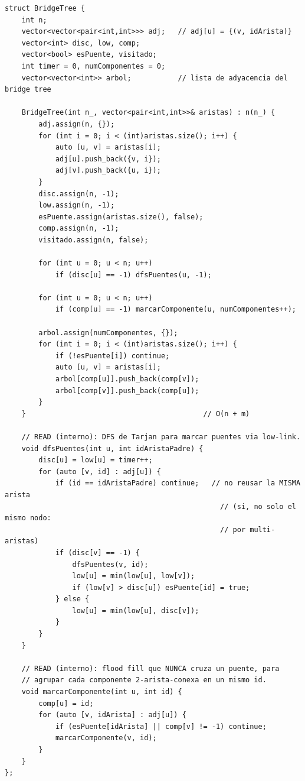\documentclass[10pt,a4paper,twocolumn]{article}
\begin{document}
\begin{lstlisting}[style=cpp]
struct BridgeTree {
    int n;
    vector<vector<pair<int,int>>> adj;   // adj[u] = {(v, idArista)}
    vector<int> disc, low, comp;
    vector<bool> esPuente, visitado;
    int timer = 0, numComponentes = 0;
    vector<vector<int>> arbol;           // lista de adyacencia del bridge tree

    BridgeTree(int n_, vector<pair<int,int>>& aristas) : n(n_) {
        adj.assign(n, {});
        for (int i = 0; i < (int)aristas.size(); i++) {
            auto [u, v] = aristas[i];
            adj[u].push_back({v, i});
            adj[v].push_back({u, i});
        }
        disc.assign(n, -1);
        low.assign(n, -1);
        esPuente.assign(aristas.size(), false);
        comp.assign(n, -1);
        visitado.assign(n, false);

        for (int u = 0; u < n; u++)
            if (disc[u] == -1) dfsPuentes(u, -1);

        for (int u = 0; u < n; u++)
            if (comp[u] == -1) marcarComponente(u, numComponentes++);

        arbol.assign(numComponentes, {});
        for (int i = 0; i < (int)aristas.size(); i++) {
            if (!esPuente[i]) continue;
            auto [u, v] = aristas[i];
            arbol[comp[u]].push_back(comp[v]);
            arbol[comp[v]].push_back(comp[u]);
        }
    }                                          // O(n + m)

    // READ (interno): DFS de Tarjan para marcar puentes via low-link.
    void dfsPuentes(int u, int idAristaPadre) {
        disc[u] = low[u] = timer++;
        for (auto [v, id] : adj[u]) {
            if (id == idAristaPadre) continue;   // no reusar la MISMA arista
                                                   // (si, no solo el mismo nodo:
                                                   // por multi-aristas)
            if (disc[v] == -1) {
                dfsPuentes(v, id);
                low[u] = min(low[u], low[v]);
                if (low[v] > disc[u]) esPuente[id] = true;
            } else {
                low[u] = min(low[u], disc[v]);
            }
        }
    }

    // READ (interno): flood fill que NUNCA cruza un puente, para
    // agrupar cada componente 2-arista-conexa en un mismo id.
    void marcarComponente(int u, int id) {
        comp[u] = id;
        for (auto [v, idArista] : adj[u]) {
            if (esPuente[idArista] || comp[v] != -1) continue;
            marcarComponente(v, id);
        }
    }
};
\end{lstlisting}
\end{document}

